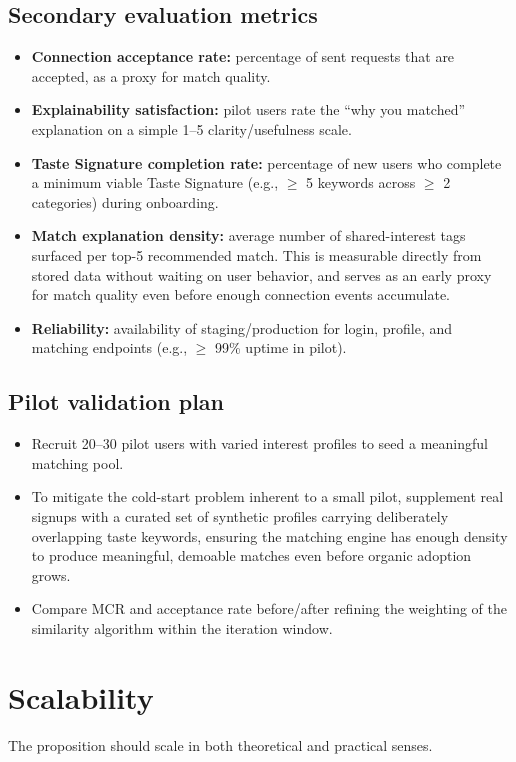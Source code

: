 \documentclass[11pt,a4paper]{article}
\begin{document}
\subsection{Secondary evaluation metrics}
\begin{itemize}[leftmargin=0.7cm]
    \item \textbf{Connection acceptance rate:} percentage of sent requests that are accepted, as a proxy for match quality.
    \item \textbf{Explainability satisfaction:} pilot users rate the ``why you matched'' explanation on a simple 1--5 clarity/usefulness scale.
    \item \textbf{Taste Signature completion rate:} percentage of new users who complete a minimum viable Taste Signature (e.g., $\ge$ 5 keywords across $\ge$ 2 categories) during onboarding.
    \item \textbf{Match explanation density:} average number of shared-interest tags surfaced per top-5 recommended match. This is measurable directly from stored data without waiting on user behavior, and serves as an early proxy for match quality even before enough connection events accumulate.
    \item \textbf{Reliability:} availability of staging/production for login, profile, and matching endpoints (e.g., $\ge$ 99\% uptime in pilot).
\end{itemize}

\subsection{Pilot validation plan}
\begin{itemize}[leftmargin=0.7cm]
    \item Recruit 20--30 pilot users with varied interest profiles to seed a meaningful matching pool.
    \item To mitigate the cold-start problem inherent to a small pilot, supplement real signups with a curated set of synthetic profiles carrying deliberately overlapping taste keywords, ensuring the matching engine has enough density to produce meaningful, demoable matches even before organic adoption grows.
    \item Compare MCR and acceptance rate before/after refining the weighting of the similarity algorithm within the iteration window.
\end{itemize}

\section{Scalability}
The proposition should scale in both theoretical and practical senses.
\end{document}
